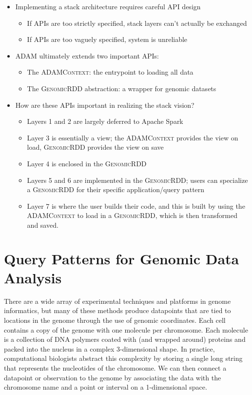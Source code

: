 \documentclass[phd]{ucbthesis}
\begin{document}
\begin{itemize}
\item Implementing a stack architecture requires careful API design
  \begin{itemize}
  \item If APIs are too strictly specified, stack layers can't actually be exchanged
  \item If APIs are too vaguely specified, system is unreliable
  \end{itemize}
\item \textsc{ADAM} ultimately extends two important APIs:
  \begin{itemize}
  \item The \textsc{ADAMContext}: the entrypoint to loading all data
  \item The \textsc{GenomicRDD} abstraction: a wrapper for genomic datasets
  \end{itemize}
\item How are these APIs important in realizing the stack vision?
  \begin{itemize}
  \item Layers 1 and 2 are largely deferred to Apache Spark
  \item Layer 3 is essentially a view; the \textsc{ADAMContext} provides the view
    on load, \textsc{GenomicRDD} provides the view on save
  \item Layer 4 is enclosed in the \textsc{GenomicRDD}
  \item Layers 5 and 6 are implemented in the \textsc{GenomicRDD}; users can
    specialize a \textsc{GenomicRDD} for their specific application/query pattern
  \item Layer 7 is where the user builds their code, and this is built by
    using the \textsc{ADAMContext} to load in a \textsc{GenomicRDD}, which is then
    transformed and saved.
  \end{itemize}
\end{itemize}

\section{Query Patterns for Genomic Data Analysis}
\label{sec:query-patterns}

There are a wide array of experimental techniques and platforms in genome informatics, but many of these
methods produce datapoints that are tied to locations in the genome through the use of genomic coordinates.
Each cell contains a copy of the genome with one molecule per chromosome. Each molecule is a collection of
DNA polymers coated with (and wrapped around) proteins and packed into the nucleus in a complex
3-dimensional shape. In practice, computational biologists abstract this complexity by storing a single long
string that represents the nucleotides of the chromosome. We can then connect a datapoint or observation to the
genome by associating the data with the chromosome name and a point or interval on a 1-dimensional space.
\end{document}
